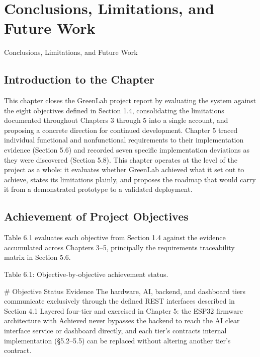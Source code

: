 
\chapter{Conclusions, Limitations, and Future Work}
\label{ch:conclusions}

Conclusions,
Limitations, and
Future Work



\section{Introduction to the Chapter}


This chapter closes the GreenLab project report by evaluating the system against the
eight objectives defined in Section 1.4, consolidating the limitations documented
throughout Chapters 3 through 5 into a single account, and proposing a concrete
direction for continued development. Chapter 5 traced individual functional and nonfunctional requirements to their implementation evidence (Section 5.6) and recorded
seven specific implementation deviations as they were discovered (Section 5.8). This
chapter operates at the level of the project as a whole: it evaluates whether GreenLab
achieved what it set out to achieve, states its limitations plainly, and proposes the
roadmap that would carry it from a demonstrated prototype to a validated deployment.


\section{Achievement of Project Objectives}


Table 6.1 evaluates each objective from Section 1.4 against the evidence accumulated
across Chapters 3--5, principally the requirements traceability matrix in Section 5.6.

Table 6.1: Objective-by-objective achievement status.

# Objective Status Evidence
The hardware, AI, backend, and dashboard
tiers communicate exclusively through the
defined REST interfaces described in Section 4.1
Layered four-tier
and exercised in Chapter 5: the ESP32 firmware
architecture with
Achieved never bypasses the backend to reach the AI
clear interface
service or dashboard directly, and each tier's
contracts
internal implementation (§5.2--5.5) can be
replaced without altering another tier's
contract.

